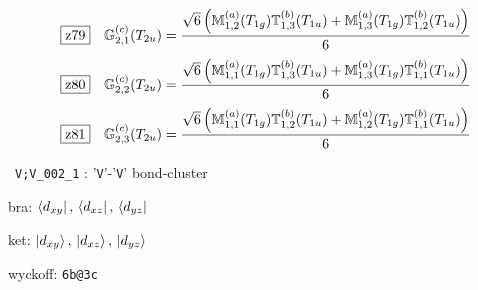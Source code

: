 \documentclass[fleqn,10pt,landscape]{jsarticle}
\begin{document}
\begin{dmath*}
\hspace*{3mm}\fbox{z79}\quad \mathbb{G}_{2,1}^{(c)}(T_{2u})=\frac{\sqrt{6} \left(\mathbb{M}_{1,2}^{(a)}(T_{1g}) \mathbb{T}_{1,3}^{(b)}(T_{1u}) + \mathbb{M}_{1,3}^{(a)}(T_{1g}) \mathbb{T}_{1,2}^{(b)}(T_{1u})\right)}{6}
\end{dmath*}
\begin{dmath*}
\hspace*{3mm}\fbox{z80}\quad \mathbb{G}_{2,2}^{(c)}(T_{2u})=\frac{\sqrt{6} \left(\mathbb{M}_{1,1}^{(a)}(T_{1g}) \mathbb{T}_{1,3}^{(b)}(T_{1u}) + \mathbb{M}_{1,3}^{(a)}(T_{1g}) \mathbb{T}_{1,1}^{(b)}(T_{1u})\right)}{6}
\end{dmath*}
\begin{dmath*}
\hspace*{3mm}\fbox{z81}\quad \mathbb{G}_{2,3}^{(c)}(T_{2u})=\frac{\sqrt{6} \left(\mathbb{M}_{1,1}^{(a)}(T_{1g}) \mathbb{T}_{1,2}^{(b)}(T_{1u}) + \mathbb{M}_{1,2}^{(a)}(T_{1g}) \mathbb{T}_{1,1}^{(b)}(T_{1u})\right)}{6}
\end{dmath*}
\vspace{5mm}

\noindent\textbullet\, \texttt{V;V_002_1} : '\texttt{V}'-'\texttt{V}' bond-cluster

\noindent\quad * bra: $\bra{d_{xy}},\, \bra{d_{xz}},\, \bra{d_{yz}}$

\noindent\quad * ket: $\ket{d_{xy}},\, \ket{d_{xz}},\, \ket{d_{yz}}$

\noindent\quad * wyckoff: \texttt{6b@3c}
\end{document}
